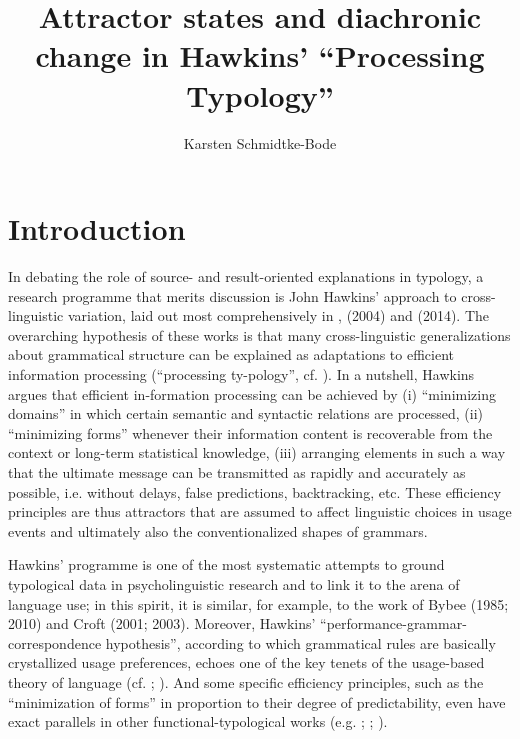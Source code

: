 \documentclass[output=paper]{langsci/langscibook}
\author{Karsten Schmidtke-Bode\affiliation{Leipzig University}}
\title{Attractor states and diachronic change in Hawkins’ “Processing Typology”}
\begin{document}
\maketitle 
 
\section{ Introduction} 

In debating the role of source- and result-oriented explanations in typology, a research programme that merits discussion is John Hawkins’ approach to cross-linguistic variation, laid out most comprehensively in \citet{Hawkins1994}, (2004) and (2014). The overarching hypothesis of these works is that many cross-linguistic generalizations about grammatical structure can be explained as adaptations to efficient information processing (“processing ty-pology”, cf. \citealt{Hawkins2007}). In a nutshell, Hawkins argues that efficient in-formation processing can be achieved by (i) “minimizing domains” in which certain semantic and syntactic relations are processed, (ii) “minimizing forms” whenever their information content is recoverable from the context or long-term statistical knowledge, (iii) arranging elements in such a way that the ultimate message can be transmitted as rapidly and accurately as possible, i.e. without delays, false predictions, backtracking, etc. These efficiency principles are thus attractors that are assumed to affect linguistic choices in usage events and ultimately also the conventionalized shapes of grammars.

Hawkins’ programme is one of the most systematic attempts to ground typological data in psycholinguistic research and to link it to the arena of language use; in this spirit, it is similar, for example, to the work of Bybee (1985; 2010) and Croft (2001; 2003). Moreover, Hawkins’ “performance-grammar-correspondence hypothesis”, according to which grammatical rules are basically crystallized usage preferences, echoes one of the key tenets of the usage-based theory of language (cf. \citealt{Langacker1987}; \citealt{KemmerBarlow2000}). And some specific efficiency principles, such as the “minimization of forms” in proportion to their degree of predictability, even have exact parallels in other functional-typological works (e.g. \citealt{Haiman1983}; \citealt{Croft2003}; \citealt{Haspelmath2008}). 
\end{document}
